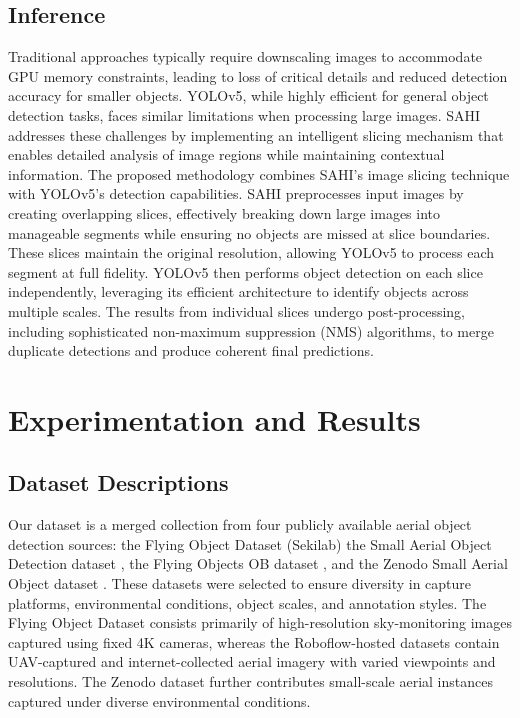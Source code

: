 \documentclass[preprint,review,12pt]{elsarticle}
\begin{document}
\subsection{Inference}
Traditional approaches typically require downscaling images to accommodate GPU memory constraints, leading to loss of critical details and reduced detection accuracy for smaller objects. YOLOv5, while highly efficient for general object detection tasks, faces similar limitations when processing large images. SAHI addresses these challenges by implementing an intelligent slicing mechanism that enables detailed analysis of image regions while maintaining contextual information. 
The proposed methodology combines SAHI's image slicing technique with YOLOv5's detection capabilities. SAHI preprocesses input images by creating overlapping slices, effectively breaking down large images into manageable segments while ensuring no objects are missed at slice boundaries. 
These slices maintain the original resolution, allowing YOLOv5 to process each segment at full fidelity. YOLOv5 then performs object detection on each slice independently, leveraging its efficient architecture to identify objects across multiple scales. The results from individual slices undergo post-processing, including sophisticated non-maximum suppression (NMS) algorithms, to merge duplicate detections and produce coherent final predictions.




\section{Experimentation and Results}

\subsection{Dataset Descriptions}
Our dataset is a merged collection from four publicly available aerial object detection sources: the Flying Object Dataset (Sekilab) \cite{sekilab_flyingobjectdataset} the Small Aerial Object Detection dataset \cite{dadore_small_aerial_object}, the Flying Objects OB dataset \cite{ogorman_flying_objects_ob}, and the Zenodo Small Aerial Object dataset \cite{makrigiorgis2022uavdataset}. These datasets were selected to ensure diversity in capture platforms, environmental conditions, object scales, and annotation styles. The Flying Object Dataset consists primarily of high-resolution sky-monitoring images captured using fixed 4K cameras, whereas the Roboflow-hosted datasets contain UAV-captured and internet-collected aerial imagery with varied viewpoints and resolutions. The Zenodo dataset further contributes small-scale aerial instances captured under diverse environmental conditions.
\end{document}
